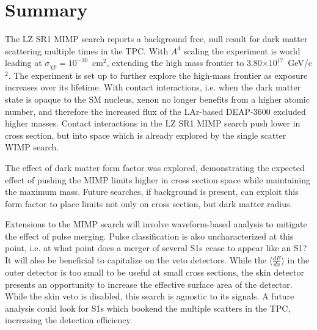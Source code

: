\afterpage{\FloatBarrier}

\section{Summary}

The LZ SR1 MIMP search reports a background free, null result for dark matter scattering multiple times in the TPC.
With $A^4$ scaling the experiment is world leading at $\sigma_{\chi p} = 10^{-30}$~cm$^2$, extending the high mass frontier to 3.80$\times10^{17}$~GeV/c$^2$.
The experiment is set up to further explore the high-mass frontier as exposure increases over its lifetime.
With contact interactions, i.e. when the dark matter state is opaque to the SM nucleus, xenon no longer benefits from a higher atomic number, and therefore the increased flux of the LAr-based DEAP-3600\cite{lai_planck_2021} excluded higher masses.
Contact interactions in the LZ SR1 MIMP search push lower in cross section, but into space which is already explored by the single scatter WIMP search.

The effect of dark matter form factor was explored, demonstrating the expected effect of pushing the MIMP limits higher in cross section space while maintaining the maximum mass.
Future searches, if background is present, can exploit this form factor to place limits not only on cross section, but dark matter radius.

Extensions to the MIMP search will involve waveform-based analysis to mitigate the effect of pulse merging.
Pulse classification is also uncharacterized at this point, i.e. at what point does a merger of several S1s cease to appear like an S1? 
It will also be beneficial to capitalize on the veto detectors.
While the $\langle \frac {dE} {dx} \rangle$ in the outer detector is too small to be useful at small cross sections, the skin detector presents an opportunity to increase the effective surface area of the detector.
While the skin veto is disabled, this search is agnostic to its signals.
A future analysis could look for S1s which bookend the multiple scatters in the TPC, increasing the detection efficiency.

